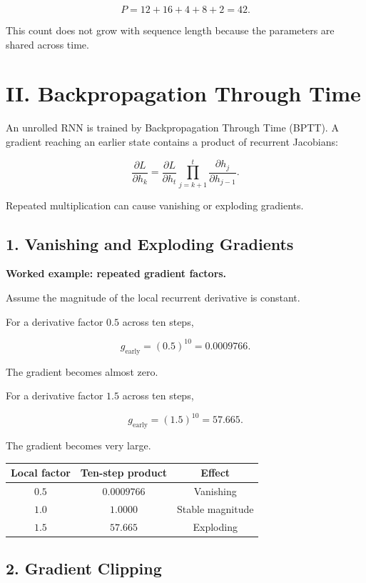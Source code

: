 \documentclass[11pt,a4paper,twoside]{article}
\begin{document}
\[
\boxed{P=12+16+4+8+2=42.}
\]

This count does not grow with sequence length because the parameters are shared across time.

\section*{II. Backpropagation Through Time}

An unrolled RNN is trained by Backpropagation Through Time (BPTT). A gradient reaching an earlier state contains a product of recurrent Jacobians:

\[
\boxed{
\frac{\partial L}{\partial h_k}
=
\frac{\partial L}{\partial h_t}
\prod_{j=k+1}^{t}
\frac{\partial h_j}{\partial h_{j-1}}
}.
\]

Repeated multiplication can cause vanishing or exploding gradients.

\subsection*{1. Vanishing and Exploding Gradients}

\textbf{Worked example: repeated gradient factors.}

Assume the magnitude of the local recurrent derivative is constant.

For a derivative factor $0.5$ across ten steps,

\[
g_{\mathrm{early}}=(0.5)^{10}=0.0009766.
\]

The gradient becomes almost zero.

For a derivative factor $1.5$ across ten steps,

\[
g_{\mathrm{early}}=(1.5)^{10}=57.665.
\]

The gradient becomes very large.

\begin{center}
\begin{tabular}{c|c|c}
\toprule
Local factor&Ten-step product&Effect\\ \midrule
$0.5$&$0.0009766$&Vanishing\\
$1.0$&$1.0000$&Stable magnitude\\
$1.5$&$57.665$&Exploding\\ \bottomrule
\end{tabular}
\end{center}

\subsection*{2. Gradient Clipping}
\end{document}
